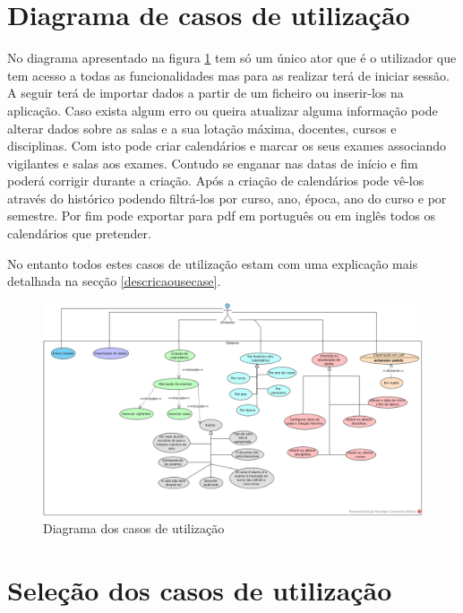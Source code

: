\documentclass[11pt, twoside]{report}
\begin{document}
	\section{Diagrama de casos de utilização}
	\label{diagrama}
	
	No diagrama apresentado na figura \ref{usecasediagram} tem só um único ator que é o utilizador que tem acesso a todas as funcionalidades mas para as realizar terá de iniciar sessão. A seguir terá de importar dados a partir de um ficheiro ou inserir-los na aplicação. Caso exista algum erro ou queira atualizar alguma informação pode alterar dados sobre as salas e a sua lotação máxima, docentes, cursos e disciplinas. Com isto pode criar calendários e marcar os seus exames associando vigilantes e salas aos exames. Contudo se enganar nas datas de início e fim poderá corrigir durante a criação. Após a criação de calendários pode vê-los através do histórico podendo filtrá-los por curso, ano, época, ano do curso e por semestre. Por fim pode exportar para pdf em português ou em inglês todos os calendários que pretender.
	
	No entanto todos estes casos de utilização estam com uma explicação mais detalhada na secção \ref{descricaousecase}.
	
	
	\clearpage
	\begin{landscape}
		\pagestyle{empty}
		
		\begin{figure}[H] 
			\centering 			\includegraphics[width=1.3\textwidth,height=1.3\textheight,keepaspectratio]{image/diagrama}
			\caption{Diagrama dos casos de utilização}
			\label{usecasediagram}
			
		\end{figure}
	\end{landscape}
	
	
	\section{Seleção dos casos de utilização}
	\label{selecaocasosdeuso}
	
\end{document}
